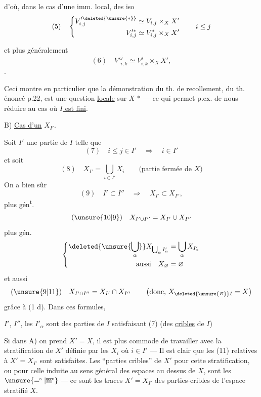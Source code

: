 d'où, dans le cas d'une imm. local,  des iso
\[
(5)\quad\left\{\begin{aligned}
V'^{\deleted{\unsure{*}}}_{i,j}&\simeq V_{i,j}\times_X X'\\
V'^{*}_{i,j}&\simeq V^*_{i,j}\times_X X'
\end{aligned}\right.\qquad i\leq j
\]

et plus généralement
\[
(6)\quad V'{}^{j}_{i,k}\simeq V^{j}_{i,k}\times_X X',
\]
.

Ceci montre en particulier que la démonstration du th. de recollement, du th. énoncé p.22, est une question \uline{locale} sur $X$ \textcircled{$*$} --- ce qui permet p.ex. de nous réduire au cas où  \uline{$I$ est fini}.



B) \uline{Cas d'un} $X_{I'}$. 

Soit $I'$ une partie de $I$ telle que
\[
(7)\quad i\leq j\in I'\quad\Longrightarrow\quad i\in I'
\]
et soit
\[
(8)\quad X_{I'}=\bigcup_{i\in I'}X_i\qquad\text{(partie fermée de $X$)}
\]
On a bien sûr
\[
(9)\quad I'\subset I''\quad\Longrightarrow\quad X_{I'}\subset X_{I''},
\]
plus gén\textsuperscript{t}.
\[
(\unsure{10|9})\quad X_{I'\cup I''}=X_{I'}\cup X_{I''}
\]
plus gén.
\[
\left\{\begin{aligned}
\deleted{\unsure{\bigcup_\alpha}}X_{\bigcup_\alpha I'_\alpha}&=\bigcup_\alpha X_{I'_\alpha}\\
\text{aussi}\quad X_{\varnothing}&=\varnothing
\end{aligned}\right.
\]
et aussi
\[
(\unsure{9|11})\quad X_{I'\cap I''}=X_{I'}\cap X_{I''}\qquad
\left(\text{donc, }X_{\deleted{\unsure{\varnothing}}I}=X\right)
\]
grâce à (1 d). Dans ces formules,

$I'$, $I''$, les $I'_\alpha$ sont des parties de $I$ satisfaisant (7) (des \uline{cribles} de $I$)

Si dans A) on prend $X'=X$, il est plus commode de travailler avec la stratification de $X'$ définie par les $X_i$ où $i\in I'$ --- Il est clair que les  (11) relatives à $X'=X_{I'}$ sont satisfaites. Les ``parties cribles'' de $X'$ pour cette stratification, ou pour celle induite au sens général des espaces au dessus de $X$, sont les $\unsure{=^{\mathrm s}|\overline{\mathrm m}^{\mathrm s}}$ --- ce sont  les traces   $X'=X_{I'}$ des parties-cribles de l'espace stratifié $X$.

